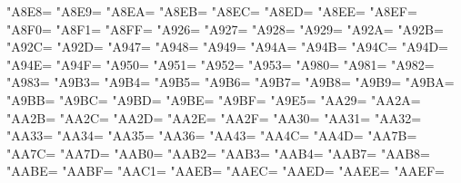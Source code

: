 \XeTeXcharclass"A8E8=\KclassCM
\XeTeXcharclass"A8E9=\KclassCM
\XeTeXcharclass"A8EA=\KclassCM
\XeTeXcharclass"A8EB=\KclassCM
\XeTeXcharclass"A8EC=\KclassCM
\XeTeXcharclass"A8ED=\KclassCM
\XeTeXcharclass"A8EE=\KclassCM
\XeTeXcharclass"A8EF=\KclassCM
\XeTeXcharclass"A8F0=\KclassCM
\XeTeXcharclass"A8F1=\KclassCM
\XeTeXcharclass"A8FF=\KclassCM
\XeTeXcharclass"A926=\KclassCM
\XeTeXcharclass"A927=\KclassCM
\XeTeXcharclass"A928=\KclassCM
\XeTeXcharclass"A929=\KclassCM
\XeTeXcharclass"A92A=\KclassCM
\XeTeXcharclass"A92B=\KclassCM
\XeTeXcharclass"A92C=\KclassCM
\XeTeXcharclass"A92D=\KclassCM
\XeTeXcharclass"A947=\KclassCM
\XeTeXcharclass"A948=\KclassCM
\XeTeXcharclass"A949=\KclassCM
\XeTeXcharclass"A94A=\KclassCM
\XeTeXcharclass"A94B=\KclassCM
\XeTeXcharclass"A94C=\KclassCM
\XeTeXcharclass"A94D=\KclassCM
\XeTeXcharclass"A94E=\KclassCM
\XeTeXcharclass"A94F=\KclassCM
\XeTeXcharclass"A950=\KclassCM
\XeTeXcharclass"A951=\KclassCM
\XeTeXcharclass"A952=\KclassCM
\XeTeXcharclass"A953=\KclassCM
\XeTeXcharclass"A980=\KclassCM
\XeTeXcharclass"A981=\KclassCM
\XeTeXcharclass"A982=\KclassCM
\XeTeXcharclass"A983=\KclassCM
\XeTeXcharclass"A9B3=\KclassCM
\XeTeXcharclass"A9B4=\KclassCM
\XeTeXcharclass"A9B5=\KclassCM
\XeTeXcharclass"A9B6=\KclassCM
\XeTeXcharclass"A9B7=\KclassCM
\XeTeXcharclass"A9B8=\KclassCM
\XeTeXcharclass"A9B9=\KclassCM
\XeTeXcharclass"A9BA=\KclassCM
\XeTeXcharclass"A9BB=\KclassCM
\XeTeXcharclass"A9BC=\KclassCM
\XeTeXcharclass"A9BD=\KclassCM
\XeTeXcharclass"A9BE=\KclassCM
\XeTeXcharclass"A9BF=\KclassCM
\XeTeXcharclass"A9E5=\KclassCM
\XeTeXcharclass"AA29=\KclassCM
\XeTeXcharclass"AA2A=\KclassCM
\XeTeXcharclass"AA2B=\KclassCM
\XeTeXcharclass"AA2C=\KclassCM
\XeTeXcharclass"AA2D=\KclassCM
\XeTeXcharclass"AA2E=\KclassCM
\XeTeXcharclass"AA2F=\KclassCM
\XeTeXcharclass"AA30=\KclassCM
\XeTeXcharclass"AA31=\KclassCM
\XeTeXcharclass"AA32=\KclassCM
\XeTeXcharclass"AA33=\KclassCM
\XeTeXcharclass"AA34=\KclassCM
\XeTeXcharclass"AA35=\KclassCM
\XeTeXcharclass"AA36=\KclassCM
\XeTeXcharclass"AA43=\KclassCM
\XeTeXcharclass"AA4C=\KclassCM
\XeTeXcharclass"AA4D=\KclassCM
\XeTeXcharclass"AA7B=\KclassCM
\XeTeXcharclass"AA7C=\KclassCM
\XeTeXcharclass"AA7D=\KclassCM
\XeTeXcharclass"AAB0=\KclassCM
\XeTeXcharclass"AAB2=\KclassCM
\XeTeXcharclass"AAB3=\KclassCM
\XeTeXcharclass"AAB4=\KclassCM
\XeTeXcharclass"AAB7=\KclassCM
\XeTeXcharclass"AAB8=\KclassCM
\XeTeXcharclass"AABE=\KclassCM
\XeTeXcharclass"AABF=\KclassCM
\XeTeXcharclass"AAC1=\KclassCM
\XeTeXcharclass"AAEB=\KclassCM
\XeTeXcharclass"AAEC=\KclassCM
\XeTeXcharclass"AAED=\KclassCM
\XeTeXcharclass"AAEE=\KclassCM
\XeTeXcharclass"AAEF=\KclassCM
